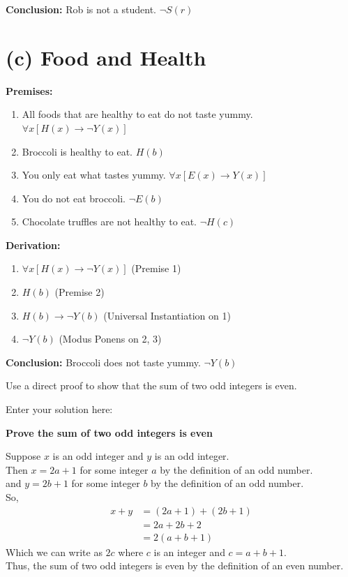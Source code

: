\documentclass[10pt]{exam}
\begin{document}
\begin{questions}
\begin{solution}
\textbf{Conclusion:} Rob is not a student. \quad $\neg S(r)$

\section*{(c) Food and Health}

\textbf{Premises:}
\begin{enumerate}
    \item All foods that are healthy to eat do not taste yummy. \quad $\forall x [H(x) \to \neg Y(x)]$
    \item Broccoli is healthy to eat. \quad $H(b)$
    \item You only eat what tastes yummy. \quad $\forall x [E(x) \to Y(x)]$
    \item You do not eat broccoli. \quad $\neg E(b)$
    \item Chocolate truffles are not healthy to eat. \quad $\neg H(c)$
\end{enumerate}

\textbf{Derivation:}
\begin{enumerate}
    \item $\forall x [H(x) \to \neg Y(x)]$ \quad (Premise 1)
    \item $H(b)$ \quad (Premise 2)
    \item $H(b) \to \neg Y(b)$ \quad (Universal Instantiation on 1)
    \item $\neg Y(b)$ \quad (Modus Ponens on 2, 3)
\end{enumerate}

\textbf{Conclusion:} Broccoli does not taste yummy. \quad $\neg Y(b)$
\end{solution}

\question[5] Use a direct proof to show that the sum of two odd integers
is even.
\begin{solution}
    Enter your solution here: 
    \begin{center}
    \textbf{Prove the sum of two odd integers is even}
    \end{center}
    Suppose $x$ is an odd integer and $y$ is an odd integer.\\
    Then $x = 2a + 1$ for some integer $a$ by the definition of an odd number.\\
    and $y = 2b + 1$ for some integer $b$ by the definition of an odd number. \\
    So,
    \begin{align*}
    x + y &= (2a + 1) + (2b + 1)\\
    &= 2a + 2b + 2\\
    &= 2(a + b + 1)
    \end{align*}
    Which we can write as $2c$ where $c$ is an integer and $c = a + b + 1$. \\
    Thus, the sum of two odd integers is even by the definition of an even number.
\end{solution}


\end{questions}
\end{document}
